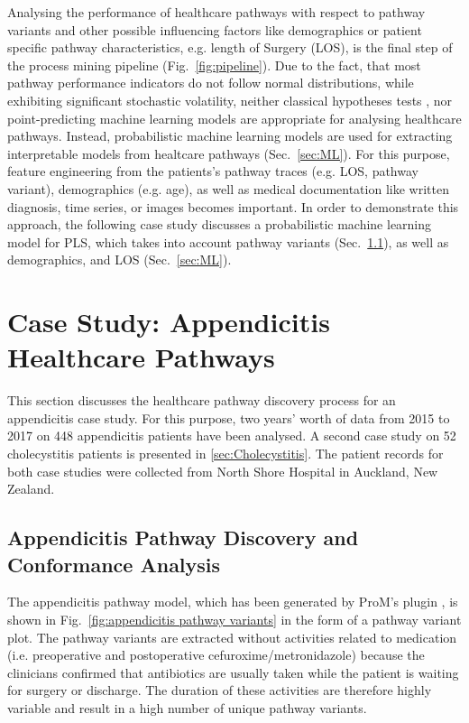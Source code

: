 Analysing the performance of healthcare pathways with respect to
pathway variants and other possible influencing factors like
demographics or patient specific pathway characteristics, e.g. length
of Surgery (LOS), is the final step of the process mining pipeline
(Fig.~\ref{fig:pipeline}).
Due to the fact, that most pathway performance indicators do not
follow normal distributions, while exhibiting significant stochastic
volatility, neither classical hypotheses tests \cite{Goodman2008_p-value}, nor point-predicting
machine learning models are appropriate for analysing healthcare
pathways.
Instead, probabilistic machine learning models
\cite{Ghahramani2015_PML} are used for extracting interpretable models
from healtcare pathways (Sec.~\ref{sec:ML}).
For this purpose, feature engineering \cite{DongLiu2018_FE} from
the patients's pathway traces (e.g. LOS, pathway variant),
demographics (e.g. age), as well as medical documentation like written
diagnosis, time series, or images becomes important.
In order to demonstrate this approach, the following case study
discusses a probabilistic machine learning model for PLS, which
takes into account pathway variants
(Sec.~\ref{Sec:DiscoveryConformance}), as well as demographics, and
LOS (Sec.~\ref{sec:ML}).

\section{Case Study: Appendicitis Healthcare Pathways}
This section discusses the healthcare pathway discovery process for an
appendicitis case study. For this purpose, two years’ worth of data
from 2015 to 2017 on 448 appendicitis patients have been analysed. 
A second case study on 52 cholecystitis patients is presented in \ref{sec:Cholecystitis}.
The patient records for both case studies were collected from North Shore Hospital in Auckland, New Zealand.

\subsection{Appendicitis Pathway Discovery and Conformance Analysis}
\label{Sec:DiscoveryConformance}
The appendicitis pathway model, which has been generated by ProM's
plugin , is shown in
Fig.~\ref{fig:appendicitis pathway variants} in the form of a pathway
variant plot.
The pathway variants are extracted without activities related to medication (i.e. preoperative and postoperative cefuroxime/metronidazole) because the clinicians confirmed that antibiotics are usually taken while the patient is waiting for surgery or discharge. The duration of these activities are therefore highly variable and result in a high number of unique pathway variants.

